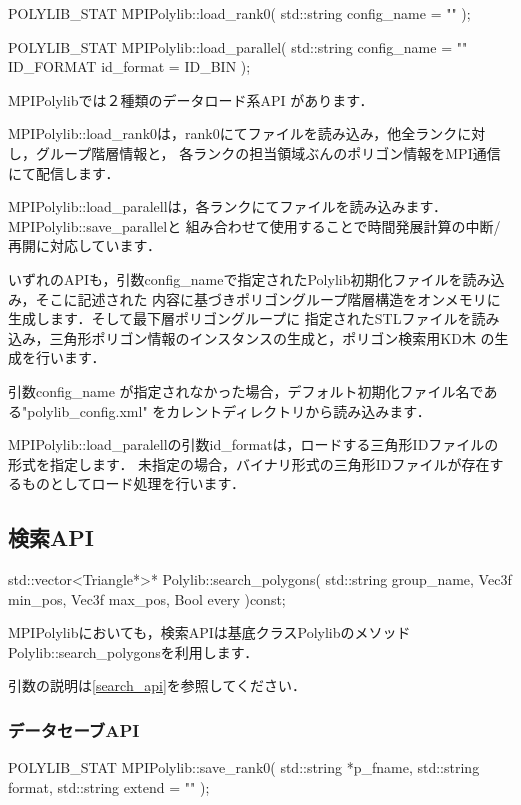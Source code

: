 {\begin{program}
	POLYLIB_STAT MPIPolylib::load_rank0(
		std::string config_name = ""
	);

	POLYLIB_STAT MPIPolylib::load_parallel(
		std::string config_name = ""
		ID_FORMAT   id_format   = ID_BIN
	);
\end{program}

MPIPolylibでは２種類のデータロード系API があります．

MPIPolylib::load\_rank0は，rank0にてファイルを読み込み，他全ランクに対し，グループ階層情報と，
各ランクの担当領域ぶんのポリゴン情報をMPI通信にて配信します．

MPIPolylib::load\_paralellは，各ランクにてファイルを読み込みます．MPIPolylib::save\_parallelと
組み合わせて使用することで時間発展計算の中断/再開に対応しています．

いずれのAPIも，引数config\_nameで指定されたPolylib初期化ファイルを読み込み，そこに記述された
内容に基づきポリゴングループ階層構造をオンメモリに生成します．そして最下層ポリゴングループに
指定されたSTLファイルを読み込み，三角形ポリゴン情報のインスタンスの生成と，ポリゴン検索用KD木
の生成を行います．

引数config\_name が指定されなかった場合，デフォルト初期化ファイル名である"polylib\_config.xml"
をカレントディレクトリから読み込みます．

MPIPolylib::load\_paralellの引数id\_formatは，ロードする三角形IDファイルの形式を指定します．
未指定の場合，バイナリ形式の三角形IDファイルが存在するものとしてロード処理を行います．

%
\subsection{検索API}

\begin{program}
	std::vector<Triangle*>* Polylib::search_polygons(
		std::string	group_name,
		Vec3f		min_pos,
		Vec3f		max_pos,
		Bool		every
	)const;
\end{program}

MPIPolylibにおいても，検索APIは基底クラスPolylibのメソッドPolylib::search\_polygonsを利用します．

引数の説明は\ref{search_api}を参照してください．

\subsubsection{データセーブAPI}

\begin{program}
	POLYLIB_STAT MPIPolylib::save_rank0(
		std::string	*p_fname,
		std::string	format,
		std::string	extend = ""
	);


\end{program}}
